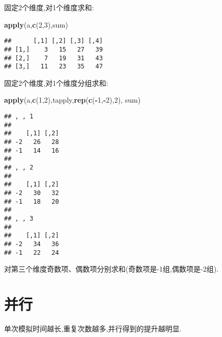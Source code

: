 \documentclass[]{ctexbook}
\newenvironment{Shaded}{\begin{snugshade}}{\end{snugshade}}
\newcommand{\DecValTok}[1]{\textcolor[rgb]{0.00,0.00,0.81}{#1}}
\newcommand{\KeywordTok}[1]{\textcolor[rgb]{0.13,0.29,0.53}{\textbf{#1}}}
\newcommand{\NormalTok}[1]{#1}
\newcommand{\OperatorTok}[1]{\textcolor[rgb]{0.81,0.36,0.00}{\textbf{#1}}}
\begin{document}
固定2个维度,对1个维度求和:

\begin{Shaded}
\begin{Highlighting}[]
\KeywordTok{apply}\NormalTok{(a,}\KeywordTok{c}\NormalTok{(}\DecValTok{2}\NormalTok{,}\DecValTok{3}\NormalTok{),sum)}
\end{Highlighting}
\end{Shaded}

\begin{verbatim}
##      [,1] [,2] [,3] [,4]
## [1,]    3   15   27   39
## [2,]    7   19   31   43
## [3,]   11   23   35   47
\end{verbatim}

固定2个维度,对1个维度分组求和:

\begin{Shaded}
\begin{Highlighting}[]
\KeywordTok{apply}\NormalTok{(a,}\KeywordTok{c}\NormalTok{(}\DecValTok{1}\NormalTok{,}\DecValTok{2}\NormalTok{),tapply,}\KeywordTok{rep}\NormalTok{(}\KeywordTok{c}\NormalTok{(}\OperatorTok{-}\DecValTok{1}\NormalTok{,}\OperatorTok{-}\DecValTok{2}\NormalTok{),}\DecValTok{2}\NormalTok{), sum)}
\end{Highlighting}
\end{Shaded}

\begin{verbatim}
## , , 1
## 
##    [,1] [,2]
## -2   26   28
## -1   14   16
## 
## , , 2
## 
##    [,1] [,2]
## -2   30   32
## -1   18   20
## 
## , , 3
## 
##    [,1] [,2]
## -2   34   36
## -1   22   24
\end{verbatim}

对第三个维度奇数项、偶数项分别求和(奇数项是-1组,偶数项是-2组).

\hypertarget{section-12}{%
\section{并行}\label{section-12}}

单次模拟时间越长,重复次数越多,并行得到的提升越明显.
\end{document}

